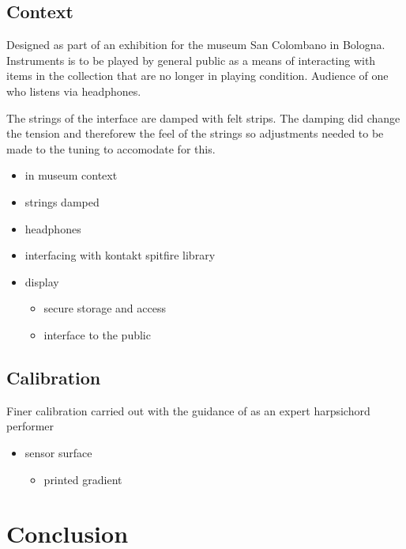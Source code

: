 \subsection{Context}\label{context}

Designed as part of an exhibition for the museum San Colombano in
Bologna. Instruments is to be played by general public as a means of
interacting with items in the collection that are no longer in playing
condition. Audience of one who listens via headphones.

The strings of the interface are damped with felt strips. The damping
did change the tension and thereforew the feel of the strings so
adjustments needed to be made to the tuning to accomodate for this.

\begin{itemize}
\item
  in museum context
\item
  strings damped
\item
  headphones
\item
  interfacing with kontakt spitfire library
\item
  display

  \begin{itemize}
  \item
    secure storage and access
  \item
    interface to the public
  \end{itemize}
\end{itemize}

\subsection{Calibration}\label{calibration}

Finer calibration carried out with the guidance of  as
an expert harpsichord performer

\begin{itemize}
\item
  sensor surface

  \begin{itemize}
  \item
    printed gradient
  \end{itemize}
\end{itemize}

\section{Conclusion}\label{conclusion}

